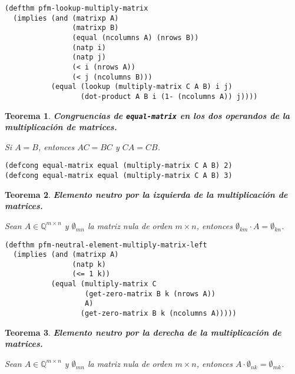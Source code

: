 \documentclass[a4paper,10pt]{article}
\newcommand{\M}[3]{#1 \in \mathbb{Q}^{#2 \times #3}}
\newtheorem{teor}{{Teorema}}
\begin{document}
\begin{lstlisting}[language=clips]
(defthm pfm-lookup-multiply-matrix
  (implies (and (matrixp A)
                (matrixp B)
                (equal (ncolumns A) (nrows B))
                (natp i)
                (natp j)
                (< i (nrows A))
                (< j (ncolumns B)))
           (equal (lookup (multiply-matrix C A B) i j)
                  (dot-product A B i (1- (ncolumns A)) j))))
\end{lstlisting}	

\par \vspace{16pt}

\begin{teor} \textbf{Congruencias de \texttt{equal-matrix} en los dos operandos de la multiplicación de matrices.}\vspace{8pt}\par
Si $A=B$, entonces $AC = BC$ y $CA = CB$.
\end{teor}

\begin{lstlisting}[language=clips]
(defcong equal-matrix equal (multiply-matrix C A B) 2)
(defcong equal-matrix equal (multiply-matrix C A B) 3)
\end{lstlisting}	

\par \vspace{16pt}

\begin{teor} \textbf{Elemento neutro por la izquierda de la multiplicación de matrices.}\vspace{8pt}\par
Sean $\M{A}{m}{n}$ y $\emptyset_{mn}$ la matriz nula de orden $m \times n$, entonces $\emptyset_{km}\cdot A = \emptyset_{kn}$.
\end{teor}

\begin{lstlisting}[language=clips]
(defthm pfm-neutral-element-multiply-matrix-left
  (implies (and (matrixp A)
                (natp k)
                (<= 1 k))
           (equal (multiply-matrix C 
                   (get-zero-matrix B k (nrows A)) 
                   A)
                  (get-zero-matrix B k (ncolumns A)))))
\end{lstlisting}	

\par \vspace{16pt}

\begin{teor} \textbf{Elemento neutro por la derecha de la multiplicación de matrices.}\vspace{8pt}\par
Sean $\M{A}{m}{n}$ y $\emptyset_{mn}$ la matriz nula de orden $m \times n$, entonces $A\cdot\emptyset_{nk} = \emptyset_{mk}$.
\end{teor}
\end{document}
